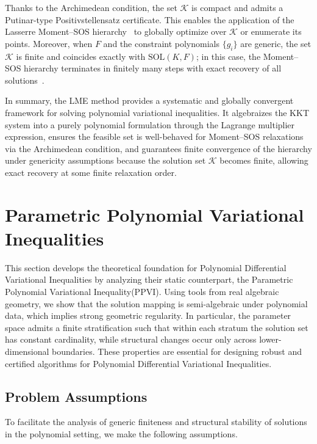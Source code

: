 \documentclass[sn-basic,Numbered]{sn-jnl}
\newcommand{\SOL}{\mathrm{SOL}}
\theoremstyle{thmstyleone}%
\begin{document}
Thanks to the Archimedean condition, the set $\mathcal{K}$ is compact and admits a Putinar-type Positivstellensatz certificate. This enables the application of the Lasserre Moment--SOS hierarchy~\cite{Lasserre2001} to globally optimize over $\mathcal{K}$ or enumerate its points. Moreover, when $F$ and the constraint polynomials $\{g_i\}$ are generic, the set $\mathcal{K}$ is finite and coincides exactly with $\SOL(K, F)$; in this case, the Moment--SOS hierarchy terminates in finitely many steps with exact recovery of all solutions~\cite{Nie2019}.

In summary, the LME method provides a systematic and globally convergent framework for solving polynomial variational inequalities. It algebraizes the KKT system into a purely polynomial formulation through the Lagrange multiplier expression, ensures the feasible set is well-behaved for Moment--SOS relaxations via the Archimedean condition, and guarantees finite convergence of the hierarchy under genericity assumptions because the solution set $\mathcal{K}$ becomes finite, allowing exact recovery at some finite relaxation order.


\section{Parametric Polynomial Variational Inequalities} \label{sec:theory}
This section develops the theoretical foundation for Polynomial Differential Variational Inequalities by analyzing their static counterpart, the Parametric Polynomial Variational Inequality(PPVI). 
Using tools from real algebraic geometry, we show that the solution mapping is semi-algebraic under polynomial data, which implies strong geometric regularity. In particular, the parameter space admits a finite stratification such that within each stratum the solution set has constant cardinality, while structural changes occur only across lower-dimensional boundaries. These properties are essential for designing robust and certified algorithms for Polynomial Differential Variational Inequalities.

\subsection{Problem Assumptions} 
To facilitate the analysis of generic finiteness and structural stability of solutions in the polynomial setting, we make the following assumptions.
\end{document}
